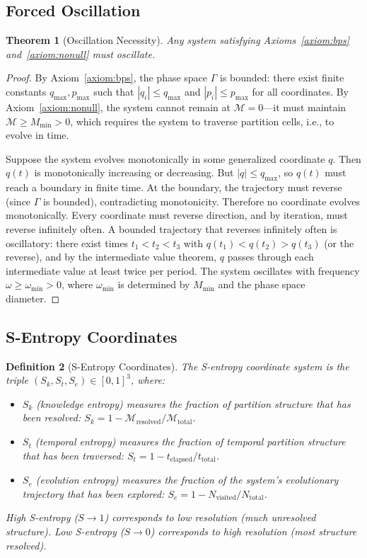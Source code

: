 \documentclass[twocolumn,10pt]{article}
\newtheorem{theorem}{Theorem}[section]
\newtheorem{definition}[theorem]{Definition}
\theoremstyle{remark}
\newcommand{\Depth}{\mathcal{M}}
\newcommand{\Sk}{S_k}
\newcommand{\St}{S_t}
\newcommand{\Se}{S_e}
\newcommand{\Mmin}{M_{\mathrm{min}}}
\begin{document}
\subsection{Forced Oscillation}

\begin{theorem}[Oscillation Necessity]
\label{thm:oscillation}
Any system satisfying Axioms~\ref{axiom:bps} and~\ref{axiom:nonull} must oscillate.
\end{theorem}

\begin{proof}
By Axiom~\ref{axiom:bps}, the phase space $\Gamma$ is bounded: there exist finite constants $q_{\max}, p_{\max}$ such that $|q_i| \leq q_{\max}$ and $|p_i| \leq p_{\max}$ for all coordinates. By Axiom~\ref{axiom:nonull}, the system cannot remain at $\Depth = 0$---it must maintain $\Depth \geq \Mmin > 0$, which requires the system to traverse partition cells, i.e., to evolve in time.

Suppose the system evolves monotonically in some generalized coordinate $q$. Then $q(t)$ is monotonically increasing or decreasing. But $|q| \leq q_{\max}$, so $q(t)$ must reach a boundary in finite time. At the boundary, the trajectory must reverse (since $\Gamma$ is bounded), contradicting monotonicity. Therefore no coordinate evolves monotonically. Every coordinate must reverse direction, and by iteration, must reverse infinitely often. A bounded trajectory that reverses infinitely often is oscillatory: there exist times $t_1 < t_2 < t_3$ with $q(t_1) < q(t_2) > q(t_3)$ (or the reverse), and by the intermediate value theorem, $q$ passes through each intermediate value at least twice per period. The system oscillates with frequency $\omega \geq \omega_{\min} > 0$, where $\omega_{\min}$ is determined by $\Mmin$ and the phase space diameter.
\end{proof}

\subsection{S-Entropy Coordinates}

\begin{definition}[S-Entropy Coordinates]
\label{def:sentropy}
The S-entropy coordinate system is the triple $(\Sk, \St, \Se) \in [0,1]^3$, where:
\begin{itemize}
\item $\Sk$ (knowledge entropy) measures the fraction of partition structure that has been resolved: $\Sk = 1 - \Depth_{\mathrm{resolved}} / \Depth_{\mathrm{total}}$.
\item $\St$ (temporal entropy) measures the fraction of temporal partition structure that has been traversed: $\St = 1 - t_{\mathrm{elapsed}} / t_{\mathrm{total}}$.
\item $\Se$ (evolution entropy) measures the fraction of the system's evolutionary trajectory that has been explored: $\Se = 1 - N_{\mathrm{visited}} / N_{\mathrm{total}}$.
\end{itemize}
High S-entropy ($S \to 1$) corresponds to low resolution (much unresolved structure). Low S-entropy ($S \to 0$) corresponds to high resolution (most structure resolved).
\end{definition}
\end{document}

